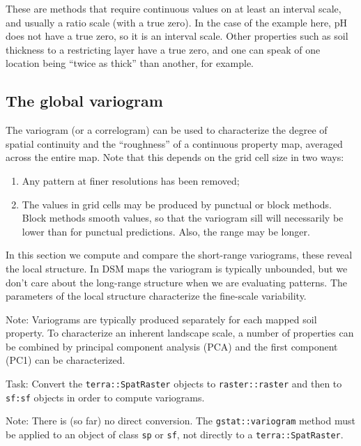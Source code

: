 \documentclass[
  letterpaper,
  DIV=11,
  numbers=noendperiod]{scrartcl}
\providecommand{\tightlist}{%
  \setlength{\itemsep}{0pt}\setlength{\parskip}{0pt}}\usepackage{longtable,booktabs,array}
\begin{document}
These are methods that require continuous values on at least an interval
scale, and usually a ratio scale (with a true zero). In the case of the
example here, pH does not have a true zero, so it is an interval scale.
Other properties such as soil thickness to a restricting layer have a
true zero, and one can speak of one location being ``twice as thick''
than another, for example.

\hypertarget{sec-vgm}{%
\subsection{The global variogram}\label{sec-vgm}}

The variogram (or a correlogram) can be used to characterize the degree
of spatial continuity and the ``roughness'' of a continuous property
map, averaged across the entire map. Note that this depends on the grid
cell size in two ways:

\begin{enumerate}
\def\labelenumi{\arabic{enumi}.}
\tightlist
\item
  Any pattern at finer resolutions has been removed;
\item
  The values in grid cells may be produced by punctual or block methods.
  Block methods smooth values, so that the variogram sill will
  necessarily be lower than for punctual predictions. Also, the range
  may be longer.
\end{enumerate}

In this section we compute and compare the short-range variograms, these
reveal the local structure. In DSM maps the variogram is typically
unbounded, but we don't care about the long-range structure when we are
evaluating patterns. The parameters of the local structure characterize
the fine-scale variability.

Note: Variograms are typically produced separately for each mapped soil
property. To characterize an inherent landscape scale, a number of
properties can be combined by principal component analysis (PCA) and the
first component (PC1) can be characterized.

Task: Convert the \texttt{terra::SpatRaster} objects to
\texttt{raster::raster} and then to \texttt{sf:sf} objects in order to
compute variograms.

Note: There is (so far) no direct conversion. The
\texttt{gstat::variogram} method must be applied to an object of class
\texttt{sp} or \texttt{sf}, not directly to a
\texttt{terra::SpatRaster}.
\end{document}
